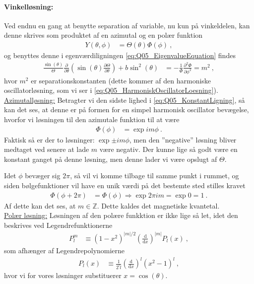 \paragraph{Vinkelløsning:} Ved endnu en gang at benytte separation af variable, nu kun på vinkeldelen, kan denne skrives som produktet af en azimutal og en polær funktion
\begin{align}
    Y(\theta,\phi) &= \Theta(\theta)\Phi(\phi) \: ,
\end{align}
og benyttes denne i egenværdiligningen \cref{eq:Q05_EigenvalueEquation} findes
\begin{align} \label{eq:Q05_KonstantLigning}
    \frac{\sin(\theta)}{\Theta} \frac{\partial}{\partial \theta} \left(\sin(\theta)\frac{\partial\Theta}{\partial\theta}\right) + b \sin^2(\theta) &= -\frac{1}{\Phi}\frac{\partial^2\Phi}{\partial\phi^2} = m^2 \: ,
\end{align}
hvor $m^2$ er separationskonstanten (dette kommer af den harmoniske oscillatorløsning, som vi ser i \cref{eq:Q05_HarmoniskOscillatorLoesning}).\\

\underline{Azimutalløsning:} Betragter vi den sidste lighed i \cref{eq:Q05_KonstantLigning}, så kan det ses, at denne er på formen for en simpel harmonisk oscillator bevægelse, hvorfor vi løsningen til den azimutale funktion til at være
\begin{align} \label{eq:Q05_HarmoniskOscillatorLoesning}
    \Phi(\phi) &= \exp{i m \phi} \: .
\end{align}
Faktisk så er der to løsninger: $\exp{\pm i m \phi}$, men den ''negative'' løsning bliver medtaget ved senere at lade $m$ være negativ. Der kunne lige så godt være en konstant ganget på denne løsning, men denne lader vi være opslugt af $\Theta$.

Idet $\phi$ bevæger sig $2\pi$, så vil vi komme tilbage til samme punkt i rummet, og siden bølgefunktioner vil have en unik værdi på det bestemte sted stilles kravet
\begin{align}
    \Phi(\phi + 2\pi) &= \Phi(\phi) \Rightarrow \exp{2\pi i m} = \exp{0} = 1 \: .
\end{align}
Af dette kan det ses, at $m \in \mathbb{Z}$. Dette kaldes det \textsf{magnetiske kvantetal}.\\

\underline{Polær løsning:} Løsningen af den polære funkktion er ikke lige så let, idet den beskrives ved Legendrefunktionerne
\begin{align}
    P_l^m &\equiv \left(1 - x^2\right)^{|m|/2}\left(\frac{\text{d}}{\text{d}x}\right)^{|m|}P_l(x) \: ,
\end{align}
som afhænger af Legendrepolynomierne
\begin{align}
    P_l(x) &\equiv \frac{1}{2^l l}\left(\frac{\text{d}}{\text{d}x}\right)^l (x^2 - 1)^l \: ,
\end{align}
hvor vi for vores løsninger substituerer $x = \cos(\theta)$.

